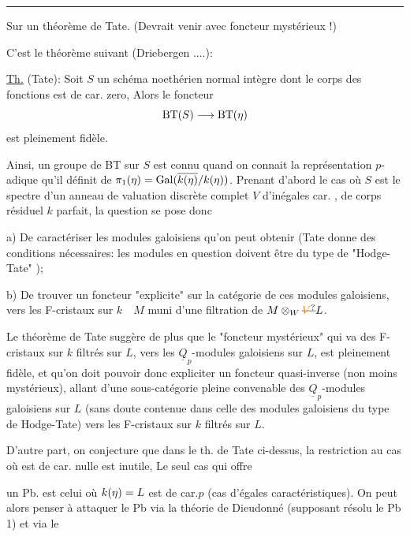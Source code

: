 \noindent\rule{\linewidth}{0.3pt}\par

 Sur un théorème de Tate. (Devrait venir avec foncteur mystérieux !)

C'est le théorème suivant (Driebergen ....):

\uline{Th.} (Tate): Soit $S$ un schéma noethérien normal intègre dont le corps des
fonctions  est de car. zero, Alors le foncteur
\[
\mathrm{BT}(S)\longrightarrow\mathrm{BT}(\eta)
\]
est pleinement fidèle.

Ainsi, un groupe de BT sur $S$ est connu  quand on connait la représentation $p$-adique qu'il définit de $\pi_{1}(\eta)=\mathrm{Gal}(\overline{k(\eta)}/k(\eta))$. Prenant d'abord
le cas où $S$ est le spectre d'un anneau de valuation discrète complet $V$
d'inégales car. , de corps  résiduel $k$ parfait, la question se pose donc

a) De caractériser les modules galoisiens qu'on peut obtenir (Tate donne
des conditions nécessaires: les modules en question doivent être du type de
"Hodge-Tate" );

b) De trouver un foncteur "explicite" sur la catégorie de ces modules galoisiens, vers les F-cristaux sur $k\quad M$ muni d'une filtration de $M\otimes_W\deleted{\unsure{V}}L$.

 Le théorème de Tate suggère de plus que le "foncteur mystérieux"
qui va des F-cristaux sur $k$ filtrés sur $L$, vers les $\underline Q_p$-modules galoisiens
sur $L$, est pleinement fidèle, et qu'on doit pouvoir donc 
expliciter un foncteur quasi-inverse (non moins mystérieux), allant d'une
sous-catégorie pleine convenable des $\underline Q_p$-modules galoisiens sur $L$ (sans
doute contenue dans celle des modules galoisiens du type de Hodge-Tate)
vers les F-cristaux sur $k$ filtrés sur $L$.

D'autre part, on conjecture que dans le th. de Tate ci-dessus, la
restriction au cas où  est de car. nulle est inutile, Le seul cas qui offre

un Pb. est celui où $k(\eta)=L$ est de car.$p$ (cas d'égales caractéristiques).
On peut alors penser à attaquer le Pb via la théorie de Dieudonné (supposant résolu le Pb 1) et via le

